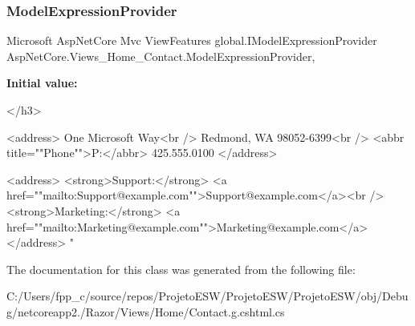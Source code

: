 \subsubsection{\texorpdfstring{Model\+Expression\+Provider}{ModelExpressionProvider}}
{\footnotesize\ttfamily Microsoft Asp\+Net\+Core Mvc View\+Features global.\+I\+Model\+Expression\+Provider Asp\+Net\+Core.\+Views\+\_\+\+Home\+\_\+\+Contact.\+Model\+Expression\+Provider\hspace{0.3cm}{\ttfamily [get]}, {}}

{\bfseries Initial value\+:}
\begin{DoxyCode}
</h3>

<address>
    One Microsoft Way<br />
    Redmond, WA 98052-6399<br />
    <abbr title=\textcolor{stringliteral}{""}Phone\textcolor{stringliteral}{""}>P:</abbr>
    425.555.0100
</address>

<address>
    <strong>Support:</strong> <a href=\textcolor{stringliteral}{""}mailto:Support@example.com\textcolor{stringliteral}{""}>Support@example.com</a><br />
    <strong>Marketing:</strong> <a href=\textcolor{stringliteral}{""}mailto:Marketing@example.com\textcolor{stringliteral}{""}>Marketing@example.com</a>
</address>
\textcolor{stringliteral}{"}
\end{DoxyCode}


The documentation for this class was generated from the following file\+:\begin{DoxyCompactItemize}
\item 
C\+:/\+Users/fpp\+\_\+c/source/repos/\+Projeto\+E\+S\+W/\+Projeto\+E\+S\+W/\+Projeto\+E\+S\+W/obj/\+Debug/netcoreapp2./\+Razor/\+Views/\+Home/Contact.\+g.\+cshtml.\+cs\end{DoxyCompactItemize}
